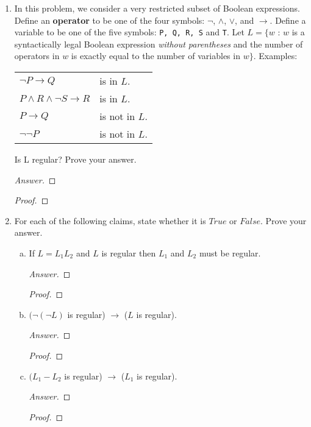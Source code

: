 \documentclass[10pt]{article}
\begin{document}
\begin{enumerate}[1)]
\item
In this problem, we consider a very restricted subset of Boolean expressions.  Define an \textbf{operator} to be one of the four symbols: $\lnot$, $\land$, $\lor$, and $\rightarrow$.  Define a variable to be one of the five symbols: \texttt{P, Q, R, S} and \texttt{T}.  Let $L = \{w$ : $w$ is a syntactically legal Boolean expression \textit{without parentheses} and the number of operators in $w$ is exactly equal to the number of variables in $w\}$.  Examples:
\begin{center}
\begin{tabular}{l@{\hspace{1cm}}l}
$\lnot P \rightarrow Q$ &is in $L$.\\
$P \land R \land \lnot S \rightarrow R$ & is in $L$.\\
$P \rightarrow Q$ & is not in $L$.\\
$\lnot \lnot P$ & is not in $L$.
\end{tabular}
\end{center}

Is L regular?  Prove your answer.
\begin{proof}[Answer]
\end{proof}
\begin{proof}[Proof]
\end{proof}


\item
For each of the following claims, state whether it is $True$ or $False$.  Prove your answer.
\begin{enumerate}[a)]
\item
If $L = L_1L_2$ and $L$ is regular then $L_1$ and $L_2$ must be regular.
\begin{proof}[Answer]
\end{proof}
\begin{proof}[Proof]
\end{proof}

\item
$(\lnot (\lnot L)$ is regular) $\rightarrow$ ($L$ is regular).
\begin{proof}[Answer]
\end{proof}
\begin{proof}[Proof]
\end{proof}

\item
$(L_1 - L_2$ is regular) $\rightarrow$ ($L_1$ is regular).
\begin{proof}[Answer]
\end{proof}
\begin{proof}[Proof]
\end{proof}


\end{enumerate}
\end{enumerate}
\end{document}
